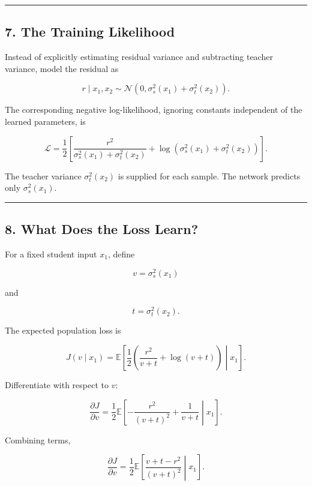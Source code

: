 \begin{center}\rule{0.5\linewidth}{0.5pt}\end{center}

\subsection{7. The Training Likelihood}\label{the-training-likelihood}

Instead of explicitly estimating residual variance and subtracting
teacher variance, model the residual as

\[
r\mid x_1,x_2
\sim
\mathcal N\left(
0,
\sigma_s^2(x_1)+\sigma_t^2(x_2)
\right).
\]

The corresponding negative log-likelihood, ignoring constants
independent of the learned parameters, is

\[
\boxed{
\mathcal L
=
\frac{1}{2}
\left[
\frac{r^2}
{\sigma_s^2(x_1)+\sigma_t^2(x_2)}
+
\log\left(
\sigma_s^2(x_1)+\sigma_t^2(x_2)
\right)
\right].
}
\]

The teacher variance \(\sigma_t^2(x_2)\) is supplied for each sample.
The network predicts only \(\sigma_s^2(x_1)\).

\begin{center}\rule{0.5\linewidth}{0.5pt}\end{center}

\subsection{8. What Does the Loss
Learn?}\label{what-does-the-loss-learn}

For a fixed student input \(x_1\), define

\[
v=\sigma_s^2(x_1)
\]

and

\[
t=\sigma_t^2(x_2).
\]

The expected population loss is

\[
J(v\mid x_1)
=
\mathbb{E}
\left[
\frac{1}{2}
\left(
\frac{r^2}{v+t}
+
\log(v+t)
\right)
\middle|x_1
\right].
\]

Differentiate with respect to \(v\):

\[
\frac{\partial J}{\partial v}
=
\frac{1}{2}
\mathbb{E}
\left[
-\frac{r^2}{(v+t)^2}
+\frac{1}{v+t}
\middle|x_1
\right].
\]

Combining terms,

\[
\boxed{
\frac{\partial J}{\partial v}
=
\frac{1}{2}
\mathbb{E}
\left[
\frac{v+t-r^2}{(v+t)^2}
\middle|x_1
\right].
}
\]

